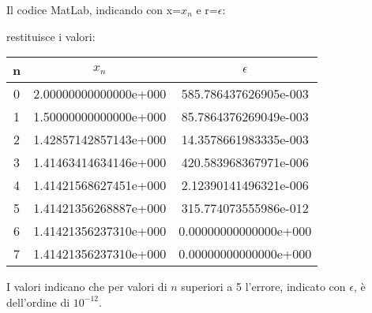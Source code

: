 Il codice MatLab, indicando con x=$x_n$ e r=$\epsilon$:

restituisce i valori:
\begin{center}
\begin{tabular}{c|c|c}
n & $x_n$ & $\epsilon$ \\
\hline
    0 & 2.00000000000000e+000 & 585.786437626905e-003\\
    1 & 1.50000000000000e+000 & 85.7864376269049e-003\\
    2 & 1.42857142857143e+000 & 14.3578661983335e-003\\
    3 & 1.41463414634146e+000 & 420.583968367971e-006\\
    4 & 1.41421568627451e+000 & 2.12390141496321e-006\\
    5 & 1.41421356268887e+000 & 315.774073555986e-012\\
    6 & 1.41421356237310e+000 & 0.00000000000000e+000\\
    7 & 1.41421356237310e+000 & 0.00000000000000e+000\\
\end{tabular}
\end{center}
I valori indicano che per valori di $n$ superiori a 5 l'errore, indicato con $\epsilon$, è dell'ordine di \(10^{-12}\).